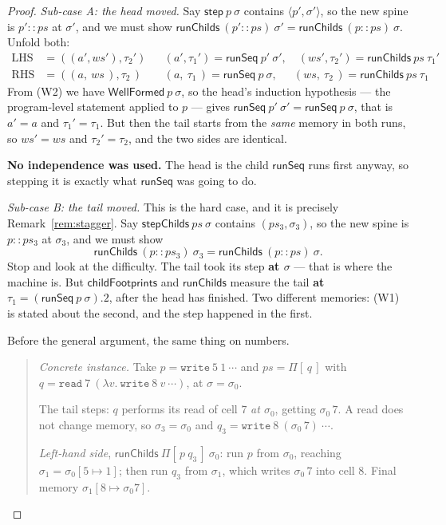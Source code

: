 \documentclass[11pt,a4paper]{article}
\theoremstyle{definition}
\theoremstyle{plain}
\theoremstyle{remark}
\newcommand{\st}{\sigma}
\newcommand{\runSeq}{\mathsf{runSeq}}
\newcommand{\wf}{\mathsf{WellFormed}}
\newcommand{\upd}[3]{#1[#2 \mapsto #3]}
\begin{document}
\begin{proof}
\emph{Sub-case A: the head moved.} Say $\mathsf{step}\ p\ \st$ contains
$\langle p', \st'\rangle$, so the new spine is $p' :: ps$ at $\st'$, and we must show
$\mathsf{runChilds}\ (p' :: ps)\ \st' = \mathsf{runChilds}\ (p :: ps)\ \st$. Unfold both:
\begin{align*}
  \text{LHS} &= ((a', ws'), \tau_2') && (a',\tau_1') = \runSeq\ p'\ \st', \quad (ws',\tau_2') = \mathsf{runChilds}\ ps\ \tau_1' \\
  \text{RHS} &= ((a,\ ws\,), \tau_2\,) && (a,\ \tau_1\,) = \runSeq\ p\ \st,\ \ \quad (ws,\ \tau_2\,) = \mathsf{runChilds}\ ps\ \tau_1
\end{align*}
From (W2) we have $\wf\ p\ \st$, so the head's induction hypothesis --- the program-level
statement applied to $p$ --- gives $\runSeq\ p'\ \st' = \runSeq\ p\ \st$, that is $a' = a$ and
$\tau_1' = \tau_1$. But then the tail starts from the \emph{same} memory in both runs, so
$ws' = ws$ and $\tau_2' = \tau_2$, and the two sides are identical.

\textbf{No independence was used.} The head is the child $\runSeq$ runs first anyway, so
stepping it is exactly what $\runSeq$ was going to do.

\emph{Sub-case B: the tail moved.} This is the hard case, and it is precisely
Remark~\ref{rem:stagger}. Say $\mathsf{stepChilds}\ ps\ \st$ contains $(ps_3, \st_3)$, so the
new spine is $p :: ps_3$ at $\st_3$, and we must show
\[
  \mathsf{runChilds}\ (p :: ps_3)\ \st_3 = \mathsf{runChilds}\ (p :: ps)\ \st .
\]
Stop and look at the difficulty. The tail took its step \textbf{at $\st$} --- that is where
the machine is. But $\mathsf{childFootprints}$ and $\mathsf{runChilds}$ measure the tail
\textbf{at $\tau_1 = (\runSeq\ p\ \st).2$}, after the head has finished. Two different
memories: (W1) is stated about the second, and the step happened in the first.

Before the general argument, the same thing on numbers.

\begin{quote}
\emph{Concrete instance.} Take $p = \texttt{write}\ 5\ 1\ \cdots$ and $ps = \Pi[\,q\,]$ with
$q = \texttt{read}\ 7\ (\lambda v.\ \texttt{write}\ 8\ v\ \cdots)$, at $\st = \st_0$.

The tail steps: $q$ performs its read of cell $7$ \emph{at $\st_0$}, getting $\st_0\,7$. A
read does not change memory, so $\st_3 = \st_0$ and
$q_3 = \texttt{write}\ 8\ (\st_0\,7)\ \cdots$.

\emph{Left-hand side}, $\mathsf{runChilds}\ \Pi[\,p\ q_3\,]\ \st_0$: run $p$ from $\st_0$,
reaching $\st_1 = \upd{\st_0}{5}{1}$; then run $q_3$ from $\st_1$, which writes $\st_0\,7$
into cell $8$. Final memory $\upd{\st_1}{8}{\st_0 7}$.


\end{quote}
\end{proof}
\end{document}
